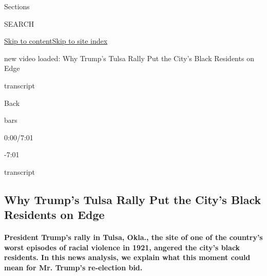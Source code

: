 Sections

SEARCH

\protect\hyperlink{site-content}{Skip to
content}\protect\hyperlink{site-index}{Skip to site index}

new video loaded: Why Trump's Tulsa Rally Put the City's Black Residents
on Edge

transcript

Back

bars

0:00/7:01

-7:01

transcript

\hypertarget{why-trumps-tulsa-rally-put-the-citys-black-residents-on-edge}{%
\subsection{Why Trump's Tulsa Rally Put the City's Black Residents on
Edge}\label{why-trumps-tulsa-rally-put-the-citys-black-residents-on-edge}}

\hypertarget{president-trumps-rally-in-tulsa-okla-the-site-of-one-of-the-countrys-worst-episodes-of-racial-violence-in-1921-angered-the-citys-black-residents-in-this-news-analysis-we-explain-what-this-moment-could-mean-for-mr-trumps-re-election-bid}{%
\paragraph{President Trump's rally in Tulsa, Okla., the site of one of
the country's worst episodes of racial violence in 1921, angered the
city's black residents. In this news analysis, we explain what this
moment could mean for Mr. Trump's re-election
bid.}\label{president-trumps-rally-in-tulsa-okla-the-site-of-one-of-the-countrys-worst-episodes-of-racial-violence-in-1921-angered-the-citys-black-residents-in-this-news-analysis-we-explain-what-this-moment-could-mean-for-mr-trumps-re-election-bid}}

